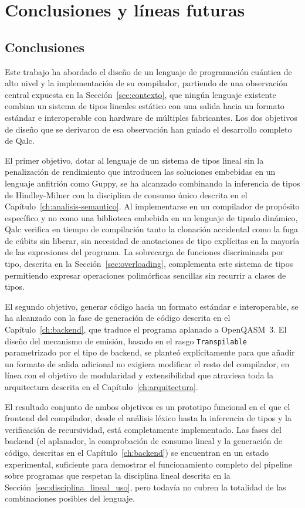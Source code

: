\chapter{Conclusiones y líneas futuras}
\label{ch:conclusiones}

\section{Conclusiones}

Este trabajo ha abordado el diseño de un lenguaje de programación cuántica de alto nivel y la implementación de su compilador, partiendo de una observación central expuesta en la Sección~\ref{sec:contexto}, que ningún lenguaje existente combina un sistema de tipos lineales estático con una salida hacia un formato estándar e interoperable con hardware de múltiples fabricantes. Los dos objetivos de diseño que se derivaron de esa observación han guiado el desarrollo completo de Qalc.

El primer objetivo, dotar al lenguaje de un sistema de tipos lineal sin la penalización de rendimiento que introducen las soluciones embebidas en un lenguaje anfitrión como Guppy, se ha alcanzado combinando la inferencia de tipos de Hindley-Milner con la disciplina de consumo único descrita en el Capítulo~\ref{ch:analisis-semantico}. Al implementarse en un compilador de propósito específico y no como una biblioteca embebida en un lenguaje de tipado dinámico, Qalc verifica en tiempo de compilación tanto la clonación accidental como la fuga de cúbits sin liberar, sin necesidad de anotaciones de tipo explícitas en la mayoría de las expresiones del programa. La sobrecarga de funciones discriminada por tipo, descrita en la Sección~\ref{sec:overloading}, complementa este sistema de tipos permitiendo expresar operaciones polimórficas sencillas sin recurrir a clases de tipos.

El segundo objetivo, generar código hacia un formato estándar e interoperable, se ha alcanzado con la fase de generación de código descrita en el Capítulo~\ref{ch:backend}, que traduce el programa aplanado a OpenQASM~3. El diseño del mecanismo de emisión, basado en el rasgo \lstinline|Transpilable| parametrizado por el tipo de backend, se planteó explícitamente para que añadir un formato de salida adicional no exigiera modificar el resto del compilador, en línea con el objetivo de modularidad y extensibilidad que atraviesa toda la arquitectura descrita en el Capítulo~\ref{ch:arquitectura}.

El resultado conjunto de ambos objetivos es un prototipo funcional en el que el frontend del compilador, desde el análisis léxico hasta la inferencia de tipos y la verificación de recursividad, está completamente implementado. Las fases del backend (el aplanador, la comprobación de consumo lineal y la generación de código, descritas en el Capítulo~\ref{ch:backend}) se encuentran en un estado experimental, suficiente para demostrar el funcionamiento completo del pipeline sobre programas que respetan la disciplina lineal descrita en la Sección~\ref{sec:disciplina_lineal_uso}, pero todavía no cubren la totalidad de las combinaciones posibles del lenguaje.

